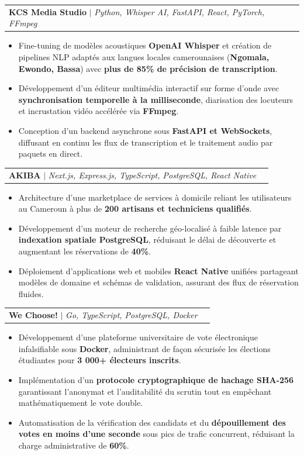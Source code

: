 \documentclass[letterpaper,10pt]{article}
\makeatletter
\newcommand{\resumeItem}[1]{
  \item\small{
    {#1 \vspace{-1.5pt}}
  }
}
\newcommand{\resumeProjectHeading}[2]{
    \item
    \begin{tabular*}{0.98\textwidth}{l@{\extracolsep{\fill}}r}
      \small#1 & #2 \\
    \end{tabular*}\vspace{-5pt}
}
\newcommand{\resumeItemListStart}{\begin{itemize}[leftmargin=0.2in, label={$\vcenter{\hbox{\tiny$\bullet$}}$}, itemsep=1.2pt, parsep=0pt]}
\newcommand{\resumeItemListEnd}{\end{itemize}\vspace{-3pt}}
\makeatother
\begin{document}
    \resumeProjectHeading
        {\textbf{KCS Media Studio} $|$ \emph{Python, Whisper AI, FastAPI, React, PyTorch, FFmpeg}}{}
        \resumeItemListStart
          \resumeItem{Fine-tuning de modèles acoustiques \textbf{OpenAI Whisper} et création de pipelines NLP adaptés aux langues locales camerounaises (\textbf{Ngomala, Ewondo, Bassa}) avec \textbf{plus de 85\% de précision de transcription}.}
          \resumeItem{Développement d'un éditeur multimédia interactif sur forme d'onde avec \textbf{synchronisation temporelle à la milliseconde}, diarisation des locuteurs et incrustation vidéo accélérée via \textbf{FFmpeg}.}
          \resumeItem{Conception d'un backend asynchrone sous \textbf{FastAPI et WebSockets}, diffusant en continu les flux de transcription et le traitement audio par paquets en direct.}
        \resumeItemListEnd

    \pagebreak

    \resumeProjectHeading
        {\textbf{AKIBA} $|$ \emph{Next.js, Express.js, TypeScript, PostgreSQL, React Native}}{}
        \resumeItemListStart
          \resumeItem{Architecture d'une marketplace de services à domicile reliant les utilisateurs au Cameroun à plus de \textbf{200 artisans et techniciens qualifiés}.}
          \resumeItem{Développement d'un moteur de recherche géo-localisé à faible latence par \textbf{indexation spatiale PostgreSQL}, réduisant le délai de découverte et augmentant les réservations de \textbf{40\%}.}
          \resumeItem{Déploiement d'applications web et mobiles \textbf{React Native} unifiées partageant modèles de domaine et schémas de validation, assurant des flux de réservation fluides.}
        \resumeItemListEnd

    \resumeProjectHeading
        {\textbf{We Choose\string!} $|$ \emph{Go, TypeScript, PostgreSQL, Docker}}{}
        \resumeItemListStart
          \resumeItem{Développement d'une plateforme universitaire de vote électronique infalsifiable sous \textbf{Docker}, administrant de façon sécurisée les élections étudiantes pour \textbf{3 000+ électeurs inscrits}.}
          \resumeItem{Implémentation d'un \textbf{protocole cryptographique de hachage SHA-256} garantissant l'anonymat et l'auditabilité du scrutin tout en empêchant mathématiquement le vote double.}
          \resumeItem{Automatisation de la vérification des candidats et du \textbf{dépouillement des votes en moins d'une seconde} sous pics de trafic concurrent, réduisant la charge administrative de \textbf{60\%}.}
        \resumeItemListEnd
\end{document}
